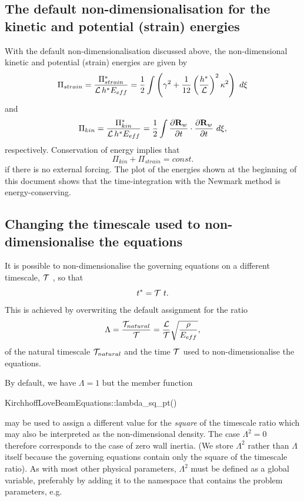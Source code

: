 \hypertarget{index_energies}{}\subsection{The default non-\/dimensionalisation for the kinetic and potential (strain) energies}\label{index_energies}
With the default non-\/dimensionalisation discussed above, the non-\/dimensional kinetic and potential (strain) energies are given by \[ \Pi_{strain} = \frac{\Pi_{strain}^*}{{\cal L} \, h^* E_{eff} } = \frac{1}{2}\int \left( \gamma^2 + \frac{1}{12}\left(\frac{h^*}{{\cal L}}\right)^2 \kappa^2 \right) \ d \xi \] and \[ \Pi_{kin} = \frac{\Pi_{kin}^*}{{\cal L} \, h^* E_{eff}} = \frac{1}{2} \int \frac{\partial {\bf R}_w}{\partial t} \cdot \frac{\partial {\bf R}_w}{\partial t} \ d \xi, \] respectively. Conservation of energy implies that \[ \Pi_{kin} + \Pi_{strain} = const. \] if there is no external forcing. The plot of the energies shown at the beginning of this document shows that the time-\/integration with the Newmark method is energy-\/conserving.



 \hypertarget{index_change_T}{}\subsection{Changing the timescale used to non-\/dimensionalise the equations}\label{index_change_T}
It is possible to non-\/dimensionalise the governing equations on a different timescale, $ {\cal T} $ , so that \[ t^* = {\cal T} \ t. \] This is achieved by overwriting the default assignment for the ratio \[ \Lambda = \frac{{\cal T}_{natural}}{{\cal T}} = \frac{{\cal L}}{{\cal T}} \sqrt{\frac{\rho}{E_{eff}}}, \] of the natural timescale $ {\cal T}_{natural}$ and the time $ {\cal T} $ used to non-\/dimensionalise the equations.

By default, we have $ \Lambda = 1 $ but the member function 
\begin{DoxyCode}
KirchhoffLoveBeamEquations::lambda\_sq\_pt()
\end{DoxyCode}
 may be used to assign a different value for the {\itshape square} of the timescale ratio which may also be interpreted as the non-\/dimensional density. The case $ \Lambda^2=0 $ therefore corresponds to the case of zero wall inertia. (We store $ \Lambda^2 $ rather than $ \Lambda $ itself because the governing equations contain only the square of the timescale ratio). As with most other physical parameters, $ \Lambda^2 $ must be defined as a global variable, preferably by adding it to the namespace that contains the problem parameters, e.\+g.


